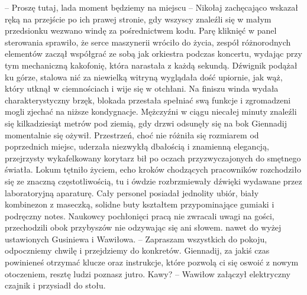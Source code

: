 \documentclass[../MAIN.tex]{subfiles}
\begin{document}
-- Proszę tutaj, lada moment będziemy na miejscu -- Nikołaj zachęcająco wskazał ręką na przejście po ich prawej stronie, gdy wszyscy znaleźli się w małym przedsionku wezwano windę za pośrednictwem kodu. Parę kliknięć w panel sterowania sprawiło, że serce maszynerii wróciło do życia, zespół różnorodnych elementów zaczął współgrać ze sobą jak orkiestra podczas koncertu, wydając przy tym mechaniczną kakofonię, która narastała z każdą sekundą. Dźwignik podążał ku górze, stalowa nić za niewielką witryną wyglądała dość upiornie, jak wąż, który utknął w ciemnościach i wije się w otchłani. Na finiszu winda wydała charakterystyczny brzęk, blokada przestała spełniać swą funkcje i zgromadzeni mogli zjechać na niższe kondygnacje. Mężczyźni w ciągu niecałej minuty znaleźli się kilkadziesiąt metrów pod ziemią, gdy drzwi odsunęły się na bok Giennadij momentalnie się ożywił. Przestrzeń, choć nie różniła się rozmiarem od poprzednich miejsc, uderzała niezwykłą dbałością i znamienną elegancją, przejrzysty wykafelkowany korytarz bił po oczach przyzwyczajonych do smętnego światła. Lokum tętniło życiem, echo kroków chodzących pracowników rozchodziło się ze znaczną częstotliwością, tu i ówdzie rozbrzmiewały dźwięki wydawane przez laboratoryjną aparaturę. Cały personel posiadał jednolity ubiór, biały kombinezon z maseczką, solidne buty kształtem przypominające gumiaki i podręczny notes. Naukowcy pochłonięci pracą nie zwracali uwagi na gości, przechodzili obok przybyszów nie odzywając się ani słowem. nawet do wyżej ustawionych Gusiniewa i Wawiłowa. 
-- Zapraszam wszystkich do pokoju, odpoczniemy chwilę i przejdziemy do konkretów. Giennadij, za jakiś czas powinieneś otrzymać klucze oraz instrukcje, które pozwolą ci się oswoić z nowym otoczeniem, resztę ludzi poznasz jutro. Kawy? -- Wawiłow załączył elektryczny czajnik i przysiadł do stołu. 
\end{document}
